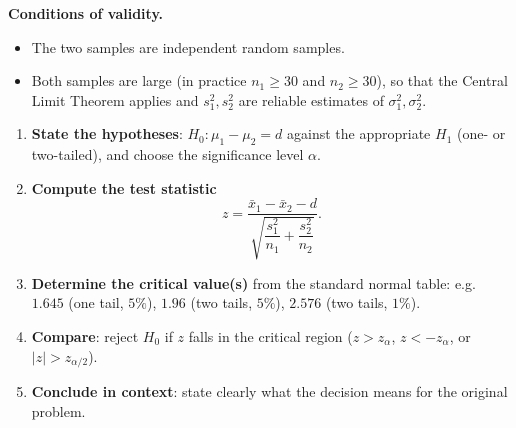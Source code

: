 \documentclass[11pt]{article}
\newcommand{\cle}[1]{{\popxbold\color{popdark}#1}}
\begin{document}
\textbf{Conditions of validity.}
\begin{itemize}
\item The two samples are \cle{independent} random samples.
\item Both samples are \cle{large} (in practice $n_1 \geq 30$ and $n_2 \geq 30$), so that the Central Limit Theorem applies and $s_1^2, s_2^2$ are reliable estimates of $\sigma_1^2, \sigma_2^2$.
\end{itemize}

\begin{methode}
\begin{enumerate}
\item \textbf{State the hypotheses}: $H_0 : \mu_1 - \mu_2 = d$ against the appropriate $H_1$ (one- or two-tailed), and choose the significance level $\alpha$.
\item \textbf{Compute the test statistic}
\[ z = \frac{\bar{x}_1 - \bar{x}_2 - d}{\sqrt{\dfrac{s_1^2}{n_1} + \dfrac{s_2^2}{n_2}}}. \]
\item \textbf{Determine the critical value(s)} from the standard normal table: e.g. $1.645$ (one tail, $5\%$), $1.96$ (two tails, $5\%$), $2.576$ (two tails, $1\%$).
\item \textbf{Compare}: reject $H_0$ if $z$ falls in the critical region ($z > z_\alpha$, $z < -z_\alpha$, or $|z| > z_{\alpha/2}$).
\item \textbf{Conclude in context}: state clearly what the decision means for the original problem.
\end{enumerate}
\end{methode}
\end{document}
